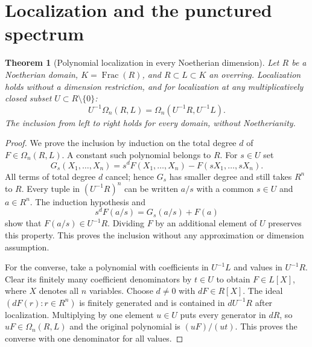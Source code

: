 \documentclass[11pt,a4paper]{article}
\newtheorem{theorem}{Theorem}[section]
\theoremstyle{definition}
\begin{document}
\section{Localization and the punctured spectrum}
\begin{theorem}[Polynomial localization in every Noetherian dimension]\label{result-26}
Let $R$ be a Noetherian domain, $K=\operatorname{Frac}(R)$,
and $R\subset L\subset K$ an overring. Localization holds
without a dimension restriction, and for localization at any
multiplicatively closed subset $U\subset R\setminus\{0\}$:
\[
 U^{-1}\Omega_n(R,L)=\Omega_n(U^{-1}R,U^{-1}L).
\]
The inclusion from left to right holds for every domain, without
Noetherianity.
\end{theorem}
\begin{proof}
We prove the inclusion by induction on the total degree $d$ of
$F\in\Omega_n(R,L)$. A constant such polynomial belongs to $R$.
For $s\in U$ set
\[
 G_s(X_1,\ldots,X_n)
   =s^dF(X_1,\ldots,X_n)-F(sX_1,\ldots,sX_n).
\]
All terms of total degree $d$ cancel; hence $G_s$ has smaller
degree and still takes $R^n$ to $R$. Every tuple in $(U^{-1}R)^n$
can be written $a/s$ with a common $s\in U$ and $a\in R^n$.
The induction hypothesis and
\[
 s^dF(a/s)=G_s(a/s)+F(a)
\]
show that $F(a/s)\in U^{-1}R$. Dividing $F$ by an additional
element of $U$ preserves this property. This proves the inclusion
without any approximation or dimension assumption.

For the converse, take a polynomial with coefficients in
$U^{-1}L$ and values in $U^{-1}R$. Clear its finitely many
coefficient denominators by $t\in U$ to obtain $F\in L[X]$,
where $X$ denotes all $n$ variables. Choose $d\ne0$ with
$dF\in R[X]$. The ideal $(dF(r):r\in R^n)$ is finitely generated
and is contained in $dU^{-1}R$ after localization.
Multiplying by one element $u\in U$ puts every generator in $dR$,
so $uF\in\Omega_n(R,L)$ and the original polynomial is
$(uF)/(ut)$. This proves the converse with one denominator for all values.
\end{proof}
\end{document}
